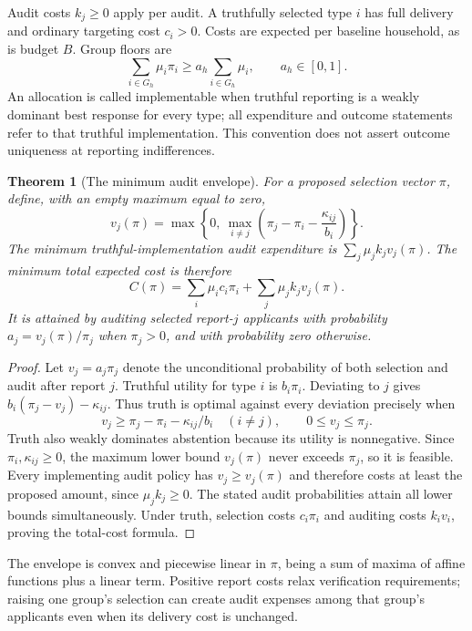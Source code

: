 \documentclass[11pt]{article}
\newtheorem{theorem}{Theorem}
\theoremstyle{remark}
\begin{document}
Audit costs $k_j\geq0$ apply per audit. A truthfully selected type $i$ has full delivery and ordinary targeting cost $c_i>0$. Costs are expected per baseline household, as is budget $B$. Group floors are
\[
 \sum_{i\in G_h}\mu_i\pi_i\geq a_h\sum_{i\in G_h}\mu_i,
 \qquad a_h\in[0,1].
\]
An allocation is called implementable when truthful reporting is a weakly dominant best response for every type; all expenditure and outcome statements refer to that truthful implementation. This convention does not assert outcome uniqueness at reporting indifferences.

\begin{theorem}[The minimum audit envelope]\label{audit}
For a proposed selection vector $\pi$, define, with an empty maximum equal to zero,
\[
 v_j(\pi)=\max\left\{0,\ \max_{i\ne j}
                 \left(\pi_j-\pi_i-\frac{\kappa_{ij}}{b_i}\right)\right\}.
\]
The minimum truthful-implementation audit expenditure is
$\sum_j\mu_jk_jv_j(\pi)$. The minimum total expected cost is therefore
\[
 C(\pi)=\sum_i\mu_ic_i\pi_i+\sum_j\mu_jk_jv_j(\pi).
\]
It is attained by auditing selected report-$j$ applicants with probability
$a_j=v_j(\pi)/\pi_j$ when $\pi_j>0$, and with probability zero otherwise.
\end{theorem}
\begin{proof}
Let $v_j=a_j\pi_j$ denote the unconditional probability of both selection and audit after report $j$. Truthful utility for type $i$ is $b_i\pi_i$. Deviating to $j$ gives $b_i(\pi_j-v_j)-\kappa_{ij}$. Thus truth is optimal against every deviation precisely when
\[
 v_j\geq\pi_j-\pi_i-\kappa_{ij}/b_i
 \quad(i\ne j),\qquad 0\leq v_j\leq\pi_j.
\]
Truth also weakly dominates abstention because its utility is nonnegative. Since $\pi_i,\kappa_{ij}\geq0$, the maximum lower bound $v_j(\pi)$ never exceeds $\pi_j$, so it is feasible. Every implementing audit policy has $v_j\geq v_j(\pi)$ and therefore costs at least the proposed amount, since $\mu_jk_j\geq0$. The stated audit probabilities attain all lower bounds simultaneously. Under truth, selection costs $c_i\pi_i$ and auditing costs $k_iv_i$, proving the total-cost formula.
\end{proof}

The envelope is convex and piecewise linear in $\pi$, being a sum of maxima of affine functions plus a linear term. Positive report costs relax verification requirements; raising one group's selection can create audit expenses among that group's applicants even when its delivery cost is unchanged.
\end{document}
